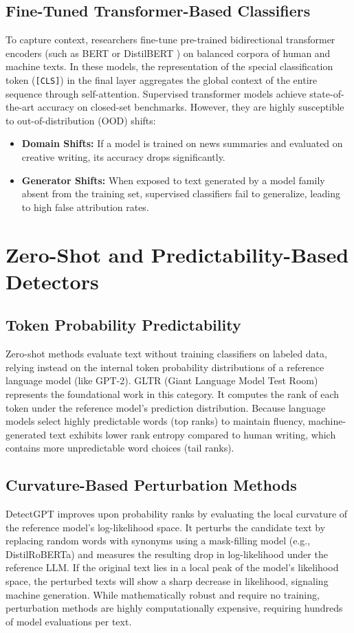 \subsection{Fine-Tuned Transformer-Based Classifiers}
To capture context, researchers fine-tune pre-trained bidirectional transformer encoders (such as BERT \cite{devlin2018bert} or DistilBERT \cite{sanh2019distilbert}) on balanced corpora of human and machine texts. In these models, the representation of the special classification token (\texttt{[CLS]}) in the final layer aggregates the global context of the entire sequence through self-attention.
Supervised transformer models achieve state-of-the-art accuracy on closed-set benchmarks. However, they are highly susceptible to out-of-distribution (OOD) shifts:
\begin{itemize}
    \item \textbf{Domain Shifts:} If a model is trained on news summaries and evaluated on creative writing, its accuracy drops significantly.
    \item \textbf{Generator Shifts:} When exposed to text generated by a model family absent from the training set, supervised classifiers fail to generalize, leading to high false attribution rates.
\end{itemize}

\section{Zero-Shot and Predictability-Based Detectors}
\subsection{Token Probability Predictability}
Zero-shot methods evaluate text without training classifiers on labeled data, relying instead on the internal token probability distributions of a reference language model (like GPT-2). GLTR (Giant Language Model Test Room) \cite{gehrmann2019gltr} represents the foundational work in this category. It computes the rank of each token under the reference model's prediction distribution. Because language models select highly predictable words (top ranks) to maintain fluency, machine-generated text exhibits lower rank entropy compared to human writing, which contains more unpredictable word choices (tail ranks).

\subsection{Curvature-Based Perturbation Methods}
DetectGPT \cite{mitchell2023detectgpt} improves upon probability ranks by evaluating the local curvature of the reference model's log-likelihood space. It perturbs the candidate text by replacing random words with synonyms using a mask-filling model (e.g., DistilRoBERTa) and measures the resulting drop in log-likelihood under the reference LLM. If the original text lies in a local peak of the model's likelihood space, the perturbed texts will show a sharp decrease in likelihood, signaling machine generation. While mathematically robust and require no training, perturbation methods are highly computationally expensive, requiring hundreds of model evaluations per text.

